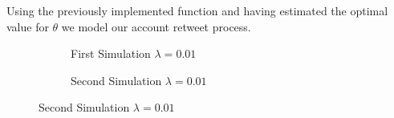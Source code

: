 Using the previously implemented function and having estimated the optimal value for $\theta$ we model our account retweet process.

\begin{figure}[H]
	\centering
	\begin{subfigure}{.5\textwidth}
		\centering
		
		\caption{First Simulation $\lambda=0.01$}
		\label{fig:sim1}
	\end{subfigure}%
	\begin{subfigure}{.5\textwidth}
		\centering
		
		\caption{Second Simulation $\lambda=0.01$}
		\label{fig:sim2}
	\end{subfigure}
\end{figure}

